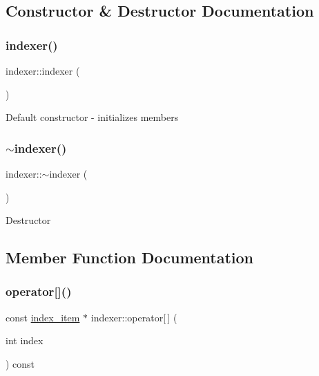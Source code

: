 \subsection{Constructor \& Destructor Documentation}
\mbox{\label{classindexer_acbbcbad080a7ae43ed78840fcf006960}} 
\subsubsection{\texorpdfstring{indexer()}{indexer()}}
{\footnotesize\ttfamily indexer\+::indexer (\begin{DoxyParamCaption}{ }\end{DoxyParamCaption})}

Default constructor -\/ initializes members \mbox{\label{classindexer_acc872b85bb2520b0cf803801811c9e58}} 
\subsubsection{\texorpdfstring{$\sim$indexer()}{~indexer()}}
{\footnotesize\ttfamily indexer\+::$\sim$indexer (\begin{DoxyParamCaption}{ }\end{DoxyParamCaption})\hspace{0.3cm}{\ttfamily [virtual]}}

Destructor 

\subsection{Member Function Documentation}
\mbox{\label{classindexer_a454e14897d75b7a89253e135faaef62a}} 
\subsubsection{\texorpdfstring{operator[]()}{operator[]()}\hspace{0.1cm}{\footnotesize\ttfamily [1/2]}}
{\footnotesize\ttfamily const \hyperlink{classindex__item}{index\+\_\+item} $\ast$ indexer\+::operator\mbox{[}$\,$\mbox{]} (\begin{DoxyParamCaption}\item[{int}]{index }\end{DoxyParamCaption}) const}

